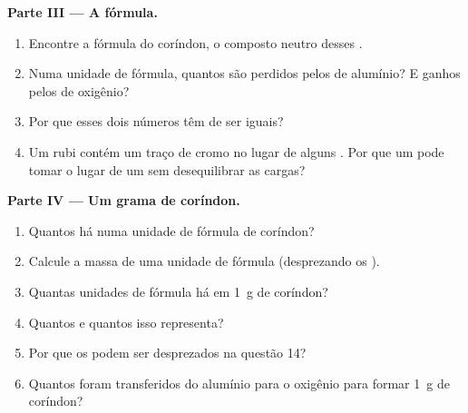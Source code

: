 \begin{problem}
\medskip
\noindent\textbf{Parte III --- A fórmula.}
\begin{enumerate}[resume]
  \item Encontre a fórmula do coríndon, o composto neutro desses .
  \item Numa unidade de fórmula, quantos  são perdidos pelos
         de alumínio? E ganhos pelos  de oxigênio?
  \item Por que esses dois números têm de ser iguais?
  \item Um rubi contém um traço de  cromo  no lugar de
        alguns . Por que um   pode tomar o
        lugar de um   sem desequilibrar as cargas?
\end{enumerate}

\medskip
\noindent\textbf{Parte IV --- Um grama de coríndon.}
\begin{enumerate}[resume]
  \item Quantos  há numa unidade de fórmula de coríndon?
  \item Calcule a massa de uma unidade de fórmula (desprezando os
        ).
  \item Quantas unidades de fórmula há em \qty{1}{g} de coríndon?
  \item Quantos   e quantos   isso
        representa?
  \item Por que os  podem ser desprezados na questão 14?
  \item Quantos  foram transferidos do alumínio para o oxigênio
        para formar \qty{1}{g} de coríndon?
\end{enumerate}
\end{problem}
